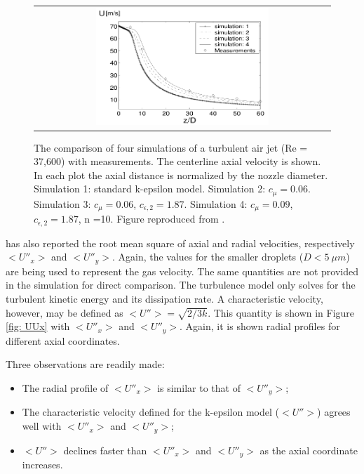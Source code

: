 \begin{figure}[!htb]
 \centering
\begin{tabular}{c}
 \includegraphics[width=0.6\textwidth]{./figuras/chap5/refs/luppes_vel.png} 
\end{tabular}
 \caption{The comparison of four simulations of a turbulent air jet (Re = 37,600) with measurements. The centerline axial velocity is shown. In each plot the axial distance is normalized by the nozzle diameter. Simulation 1:
standard k-epsilon model. Simulation 2: $c_{\mu} =0.06$. Simulation 3: $c_{\mu}=0.06$, $c_{\epsilon, 2} =1.87$. Simulation 4: $c_{\mu}=0.09$, $c_{\epsilon, 2}=1.87$, n =10. Figure reproduced from \cite{luppes}.}
 \label{fig: luppes}
\end{figure}

 \cite{chen} has also reported the root mean square of axial and radial velocities, respectively $<U''_x>$ and $<U''_y>$. Again, the values for the smaller droplets ($D< 5\ \mu m$) are being used to represent the gas velocity. The same quantities are not provided in the simulation for direct comparison. The turbulence model only solves for the turbulent kinetic energy and its dissipation rate. A characteristic velocity, however, may be defined as $<U''>=\sqrt{2/3 k}$. This quantity is shown in Figure \ref{fig: UUx} with $<U''_x>$ and $<U''_y>$. Again, it is shown radial profiles for different axial coordinates.

Three observations are readily made:  
\begin{itemize}
  \item The radial profile of $<U''_x>$ is similar to that of $<U''_y>$;
  \item The characteristic velocity defined for the k-epsilon model ($<U''>$) agrees well with $<U''_x>$ and $<U''_y>$;
 \item $<U''>$ declines faster than $<U''_x>$ and $<U''_y>$ as the axial coordinate increases.
\end{itemize}

